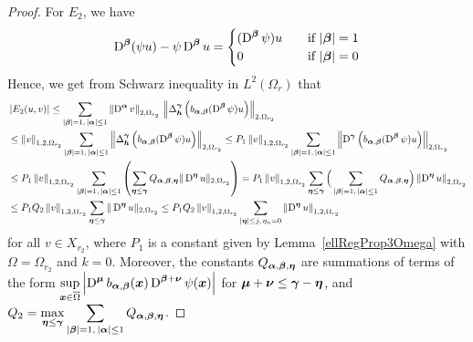 \begin{proof}
For $E_2$, we have
\[
\operatorname{D}^{{\bm{\beta}}}( \psi u) - \psi \operatorname{D}^{{\bm{\beta}}} u =
\begin{cases}
(\operatorname{D}^{{\bm{\beta}}} \psi ) u  & \quad \text{if} \ |{\bm{\beta}}|=1 \\
0 & \quad \text{if} \ |{\bm{\beta}}| = 0
\end{cases}
\]
Hence, we get from Schwarz inequality in $\displaystyle L^2(\Omega_r)$ that
\begin{align*}
&\left| E_2(u,v) \right|
\leq \sum_{|{\bm{\beta}}|= 1,\,|{\bm{\alpha}}|\leq 1}
\left\| \operatorname{D}^{{\bm{\alpha}}} v\right\|_{2,\Omega_{r_2}} \,
\left\| \Delta_{{\bm{h}}}^{{\bm{\gamma}}} \left( b_{{\bm{\alpha}},{\bm{\beta}}}
(\operatorname{D}^{{\bm{\beta}}} \psi) u \right)\right\|_{2,\Omega_{r_2}} \\
&\leq \left\|v\right\|_{1,2,\Omega_{r_2}}
\sum_{|{\bm{\beta}}|= 1,\,|{\bm{\alpha}}|\leq 1} \left\| 
\Delta_{{\bm{h}}}^{{\bm{\gamma}}} \left( b_{{\bm{\alpha}},{\bm{\beta}}}
(\operatorname{D}^{{\bm{\beta}}} \psi) u \right) \right\|_{2,\Omega_{r_2}}
\leq P_1 \left\|v\right\|_{1,2,\Omega_{r_2}}
\sum_{|{\bm{\beta}}|= 1,\,|{\bm{\alpha}}|\leq 1} \left\| 
\operatorname{D}^{{\bm{\gamma}}} \left( b_{{\bm{\alpha}},{\bm{\beta}}}
(\operatorname{D}^{{\bm{\beta}}} \psi) u \right) \right\|_{2,\Omega_{r_2}} \\
&\leq P_1 \left\|v\right\|_{1,2,\Omega_{r_2}}
\sum_{|{\bm{\beta}}|=1,\,|{\bm{\alpha}}|\leq 1} \left(
\sum_{{\bm{\eta}} \leq {\bm{\gamma}}} Q_{{\bm{\alpha}},{\bm{\beta}},{\bm{\eta}}}
\| \operatorname{D}^{{\bm{\eta}}} u \|_{2,\Omega_{r_2}} \right)
= P_1 \left\|v\right\|_{1,2,\Omega_{r_2}}
\sum_{{\bm{\eta}} \leq {\bm{\gamma}}} \Big(
\sum_{|{\bm{\beta}}|=1,\,|{\bm{\alpha}}|\leq 1}
Q_{{\bm{\alpha}},{\bm{\beta}},{\bm{\eta}}} \Big)
\left\| \operatorname{D}^{{\bm{\eta}}} u \right\|_{2,\Omega_{r_2}} \\
&\leq P_1 Q_2 \left\|v\right\|_{1,2,\Omega_{r_2}}
\sum_{{\bm{\eta}} \leq {\bm{\gamma}}}
\| \operatorname{D}^{{\bm{\eta}}} u \|_{2,\Omega_{r_2}}
\leq P_1 Q_2 \left\|v\right\|_{1,2,\Omega_{r_2}}
\sum_{|{\bm{\eta}}|\leq j,\,\eta_n=0}
\left\| \operatorname{D}^{{\bm{\eta}}} u \right\|_{1,2,\Omega_{r_2}}
\end{align*}
for all $v \in X_{r_2}$, where $P_1$ is a constant given by
Lemma~\ref{ellRegProp3Omega} with $\Omega = \Omega_{r_2}$ and $k=0$.
Moreover, the constants $Q_{{\bm{\alpha}},{\bm{\beta}},{\bm{\eta}}}$ are
summations of terms of the form
$\displaystyle \sup_{{\bm{x}} \in \overline{\Omega}} \left|\operatorname{D}^{{\bm{\mu}}}
b_{{\bm{\alpha}},{\bm{\beta}}}({\bm{x}})\operatorname{D}^{{\bm{\beta}}+{\bm{\nu}}}
\psi({\bm{x}}) \right|$
for ${\bm{\mu}}+{\bm{\nu}} \leq {\bm{\gamma}} - {\bm{\eta}}$, and
$\displaystyle Q_2 = \max_{{\bm{\eta}} \leq {\bm{\gamma}}}
\sum_{|{\bm{\beta}}|=1,\,|{\bm{\alpha}}|\leq 1}
Q_{{\bm{\alpha}},{\bm{\beta}},{\bm{\eta}}}$.


\end{proof}
